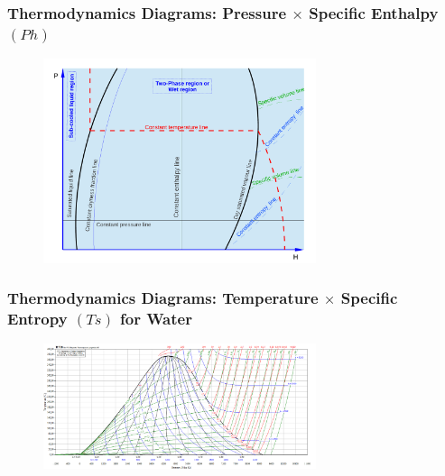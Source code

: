 \documentclass[10pt,compress,handout,ignorenonframetext]{beamer}
\begin{document}
\begin{frame}
 \frametitle{Thermodynamics Diagrams: Pressure $\times$ Specific Enthalpy $(Ph)$}
  \begin{center}
   \begin{figure}
      \includegraphics[width=8cm,height=7.cm,clip]{./Pics/Overview_Refrig17}
   \end{figure}
   \end{center}
\end{frame}

\begin{frame}
 \frametitle{Thermodynamics Diagrams: Temperature $\times$ Specific Entropy $(Ts)$ for Water}
  \begin{center}
   \begin{figure}
     \includegraphics[width=8cm,height=7.cm,clip]{./Pics/water_TS.png}
   \end{figure}
   \end{center}
\end{frame}
\end{document}
